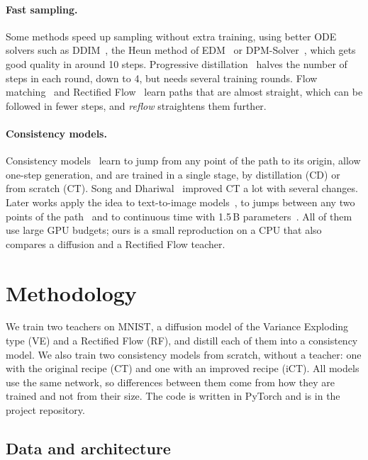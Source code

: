\documentclass{article}
\begin{document}
\paragraph{Fast sampling.} Some methods speed up sampling without extra
training, using better ODE solvers such as DDIM~\cite{song2021ddim}, the Heun
method of EDM~\cite{karras2022edm} or DPM-Solver~\cite{lu2022dpmsolver}, which
gets good quality in around 10 steps. Progressive
distillation~\cite{salimans2022progressive} halves the number of steps in each
round, down to 4, but needs several training rounds. Flow
matching~\cite{lipman2023flow} and Rectified Flow~\cite{liu2023flow} learn
paths that are almost straight, which can be followed in fewer steps, and
\emph{reflow} straightens them further.

\paragraph{Consistency models.} Consistency
models~\cite{song2023consistency} learn to jump from any point of the path to
its origin, allow one-step generation, and are trained in a single stage, by
distillation (CD) or from scratch (CT). Song and
Dhariwal~\cite{song2024improved} improved CT a lot with several changes. Later
works apply the idea to text-to-image models~\cite{luo2023lcm}, to jumps
between any two points of the path~\cite{kim2024ctm} and to continuous time
with 1.5\,B parameters~\cite{lu2025scm}. All of them use large GPU budgets; ours
is a small reproduction on a CPU that also compares a diffusion and a Rectified
Flow teacher.

\section{Methodology}
\label{sec:methodology}

We train two teachers on MNIST, a diffusion model of the Variance Exploding
type (VE) and a Rectified Flow (RF), and distill each of them into a
consistency model. We also train two consistency models from scratch, without a
teacher: one with the original recipe (CT) and one with an improved recipe
(iCT). All models use the same network, so differences between them come from
how they are trained and not from their size. The code is written in PyTorch
and is in the project repository.

\subsection{Data and architecture}
\label{sec:data}
\end{document}
